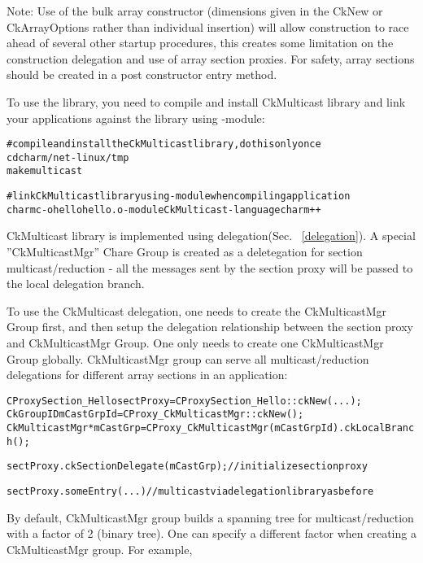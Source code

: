 Note: Use of the bulk array constructor (dimensions given in the CkNew
or CkArrayOptions rather than individual insertion) will allow
construction to race ahead of several other startup procedures, this
creates some limitation on the construction delegation and use of
array section proxies.  For safety, array sections should be
created in a post constructor entry method.


\label {array_section_multicast}


To use the library, you need to compile and install CkMulticast library and 
link your applications against the library using -module:

\begin{alltt}
  # compile and install the CkMulticast library, do this only once
  cd charm/net-linux/tmp
  make multicast

  # link CkMulticast library using -module when compiling application
  charmc  -o hello hello.o -module CkMulticast -language charm++ 
\end{alltt}

CkMulticast library is implemented using delegation(Sec. ~\ref{delegation}). 
A special ''CkMulticastMgr'' Chare Group is created as a 
deletegation for section multicast/reduction - all the messages sent
by the section proxy will be passed to the local delegation branch.

To use the CkMulticast delegation, one needs to create the CkMulticastMgr Group 
first, and then setup the delegation relationship between the section proxy and 
CkMulticastMgr Group. 
One only needs to create one CkMulticastMgr Group globally.
CkMulticastMgr group can serve all multicast/reduction delegations
for different array sections in an application:

\begin{alltt}
  CProxySection_Hello sectProxy = CProxySection_Hello::ckNew(...);
  CkGroupID mCastGrpId = CProxy_CkMulticastMgr::ckNew();
  CkMulticastMgr *mCastGrp = CProxy_CkMulticastMgr(mCastGrpId).ckLocalBranch();

  sectProxy.ckSectionDelegate(mCastGrp);  // initialize section proxy

  sectProxy.someEntry(...)           //multicast via delegation library as before
\end{alltt}

By default, CkMulticastMgr group builds a spanning tree for multicast/reduction
with a factor of 2 (binary tree).
One can specify a different factor when creating a CkMulticastMgr group.
For example,

